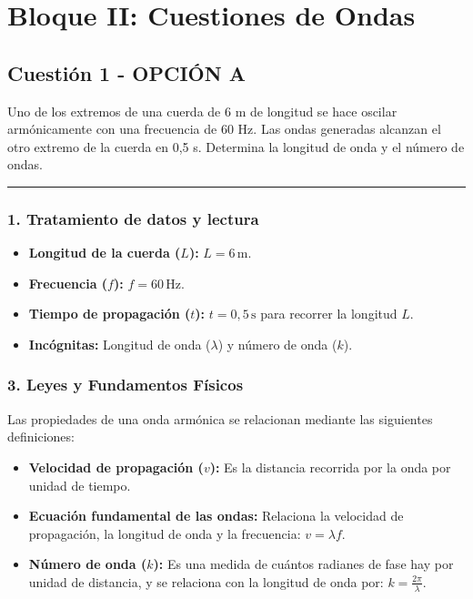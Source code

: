 \newpage

\section{Bloque II: Cuestiones de Ondas}
\label{sec:ondas_2008_jun_ord}

\subsection{Cuestión 1 - OPCIÓN A}
\label{subsec:2A_2008_jun_ord}

\begin{cajaenunciado}
Uno de los extremos de una cuerda de 6 m de longitud se hace oscilar armónicamente con una frecuencia de 60 Hz. Las ondas generadas alcanzan el otro extremo de la cuerda en 0,5 s. Determina la longitud de onda y el número de ondas.
\end{cajaenunciado}
\hrule

\subsubsection*{1. Tratamiento de datos y lectura}
\begin{itemize}
    \item \textbf{Longitud de la cuerda ($L$):} $L=6\,\text{m}$.
    \item \textbf{Frecuencia ($f$):} $f=60\,\text{Hz}$.
    \item \textbf{Tiempo de propagación ($t$):} $t=0,5\,\text{s}$ para recorrer la longitud $L$.
    \item \textbf{Incógnitas:} Longitud de onda ($\lambda$) y número de onda ($k$).
\end{itemize}

\subsubsection*{3. Leyes y Fundamentos Físicos}
Las propiedades de una onda armónica se relacionan mediante las siguientes definiciones:
\begin{itemize}
    \item \textbf{Velocidad de propagación ($v$):} Es la distancia recorrida por la onda por unidad de tiempo.
    \item \textbf{Ecuación fundamental de las ondas:} Relaciona la velocidad de propagación, la longitud de onda y la frecuencia: $v = \lambda f$.
    \item \textbf{Número de onda ($k$):} Es una medida de cuántos radianes de fase hay por unidad de distancia, y se relaciona con la longitud de onda por: $k = \frac{2\pi}{\lambda}$.
\end{itemize}

